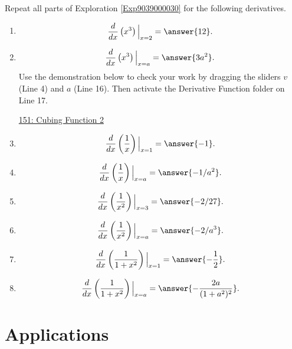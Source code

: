 \documentclass{ximera}
\begin{document}
\begin{exploration} \label{Exp4354567778}
Repeat all parts of Exploration \ref{Exp9039000030} for the following derivatives.

\begin{enumerate}
\item 
\[
      \frac{d}{dx}\left( x^3 \right)\Big|_{x=2} = \answer{12} .
\]

\item
\[
      \frac{d}{dx}\left( x^3 \right)\Big|_{x=a} = \answer{3a^2} .
\]
Use the demonstration below to check your work by dragging the sliders $v$ (Line 4) and $a$ (Line 16). Then activate the Derivative Function folder on Line 17.

\begin{onlineOnly}
    \begin{center}
\end{center}
\end{onlineOnly}

\href{https://www.desmos.com/calculator/ewy7jqij6s}{151: Cubing Function 2}




\item
\[
      \frac{d}{dx}\left( \frac{1}{x} \right)\Big|_{x=1} = \answer{-1} .
\]

\item
\[
      \frac{d}{dx}\left(\frac{1}{x} \right)\Big|_{x=a} = \answer{-1/a^2} .
\]

\item
\[
      \frac{d}{dx}\left(\frac{1}{x^2} \right)\Big|_{x=3} = \answer{-2/27} .
\]

\item
\[
      \frac{d}{dx}\left(\frac{1}{x^2} \right)\Big|_{x=a} = \answer{-2/a^3} .
\]

\item
\[
      \frac{d}{dx}\left(\frac{1}{1+x^2} \right)\Big|_{x=1} = \answer{-\frac{1}{2}} .
\]

\item
\[
      \frac{d}{dx}\left(\frac{1}{1+x^2} \right)\Big|_{x=a} = \answer{-\frac{2a}{(1+a^2)^2}} .
\]

\end{enumerate}

\end{exploration}

\section{Applications}
\end{document}
